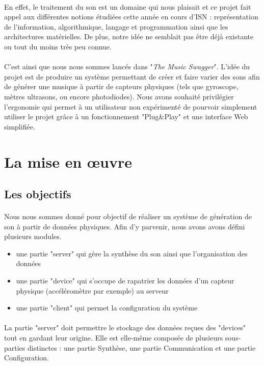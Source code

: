 \documentclass[12pt]{article}
\begin{document}
	\paragraph{}
	En effet, le traitement du son est un domaine qui nous plaisait  et ce projet fait appel aux différentes notions étudiées cette année en cours d'ISN : représentation de l'information, algorithmique, langage et programmation ainsi que les architectures matérielles. De plus, notre idée ne semblait pas être déjà existante ou tout du moins très peu connue.
	\paragraph{}
	C'est ainsi que nous nous sommes lancés dans "\textit{The Music Swagger}". L'idée du projet est de produire un système permettant de créer et faire varier des sons afin de générer une musique à partir de capteurs physiques (tels que gyroscope, mètres ultrasons, ou encore photodiodes). Nous avons souhaité privilégier l'ergonomie qui permet à un utilisateur non expérimenté de pourvoir simplement utiliser le projet grâce à un fonctionnement "Plug\&Play" et une interface Web simplifiée.
	
	\newpage
	\section{La mise en œuvre}
	\subsection{Les objectifs}
	\paragraph{}
	Nous nous sommes donné pour objectif de réaliser un système de génération de son à partir de données physiques. Afin d'y parvenir, nous avons avons défini plusieurs modules.
	\begin{itemize}
		\item une partie "server" qui gère la synthèse du son ainsi que l'organisation des données
		\item une partie "device" qui s'occupe de rapatrier les données d'un capteur physique (accéléromètre par exemple) au serveur
		\item une partie "client" qui permet la configuration du système
	\end{itemize}
	\paragraph{}
	La partie "server" doit permettre le stockage des données reçues des "devices" tout en gardant leur origine. Elle est elle-même composée de plusieurs sous-parties distinctes : une partie Synthèse, une partie Communication et une partie Configuration.
\end{document}
